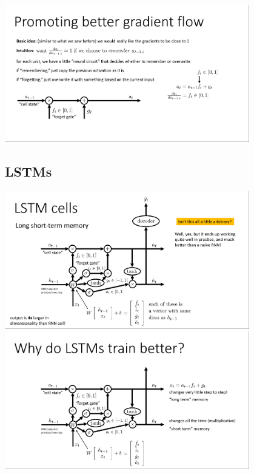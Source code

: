 \documentclass{book}
\begin{document}
\begin{figure}[H]
    \includegraphics[width=0.95\textwidth]{images/lec10_13.png}
    \subsection{LSTMs}
    \includegraphics[width=0.95\textwidth]{images/lec10_14.png}
    \includegraphics[width=0.95\textwidth]{images/lec10_15.png}
\end{figure}
\end{document}
